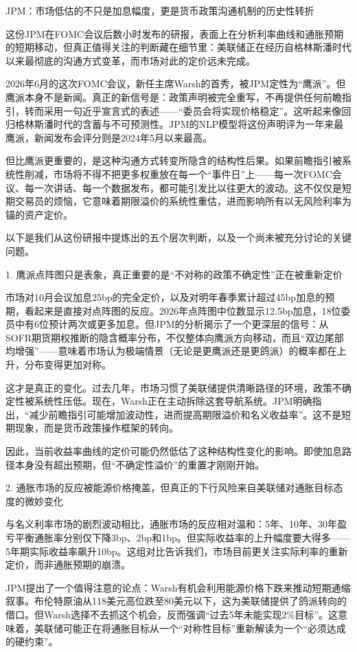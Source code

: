 \documentclass[11pt]{ctexart}
\begin{document}
JPM：市场低估的不只是加息幅度，更是货币政策沟通机制的历史性转折

这份JPM在FOMC会议后数小时发布的研报，表面上在分析利率曲线和通胀预期的短期移动，但真正值得关注的判断藏在细节里：美联储正在经历自格林斯潘时代以来最彻底的沟通方式变革，而市场对此的定价远未完成。

2026年6月的这次FOMC会议，新任主席Warsh的首秀，被JPM定性为“鹰派”。但鹰派本身不是新闻。真正的新信号是：政策声明被完全重写，不再提供任何前瞻指引，转而采用一句近乎宣言式的表述——“委员会将实现价格稳定”。这听起来像回归格林斯潘时代的含蓄与不可预测性。JPM的NLP模型将这份声明评为一年来最鹰派，新闻发布会评分则是2024年5月以来最高。

但比鹰派更重要的，是这种沟通方式转变所隐含的结构性后果。如果前瞻指引被系统性削减，市场将不得不把更多权重放在每一个“事件日”上——每一次FOMC会议、每一次讲话、每一个数据发布，都可能引发比以往更大的波动。这不仅仅是短期交易员的烦恼，它意味着期限溢价的系统性重估，进而影响所有以无风险利率为锚的资产定价。

以下是我们从这份研报中提炼出的五个层次判断，以及一个尚未被充分讨论的关键问题。

1. 鹰派点阵图只是表象，真正重要的是“不对称的政策不确定性”正在被重新定价

市场对10月会议加息25bp的完全定价，以及对明年春季累计超过45bp加息的预期，看起来是直接对点阵图的反应。2026年点阵图中位数显示12.5bp加息，18位委员中有6位预计两次或更多加息。但JPM的分析揭示了一个更深层的信号：从SOFR期货期权推断的隐含概率分布，不仅整体向鹰派方向移动，而且“双边尾部均增强”——意味着市场认为极端情景（无论是更鹰派还是更鸽派）的概率都在上升，分布变得更加对称。

这才是真正的变化。过去几年，市场习惯了美联储提供清晰路径的环境，政策不确定性被系统性压低。现在，Warsh正在主动拆除这套导航系统。JPM明确指出，“减少前瞻指引可能增加波动性，进而提高期限溢价和名义收益率”。这不是短期现象，而是货币政策操作框架的转向。

因此，当前收益率曲线的定价可能仍然低估了这种结构性变化的影响。即使加息路径本身没有超出预期，但“不确定性溢价”的重置才刚刚开始。

2. 通胀市场的反应被能源价格掩盖，但真正的下行风险来自美联储对通胀目标态度的微妙变化

与名义利率市场的剧烈波动相比，通胀市场的反应相对温和：5年、10年、30年盈亏平衡通胀率分别仅下降3bp、2bp和1bp。但实际收益率的上升幅度要大得多——5年期实际收益率飙升10bp。这组对比告诉我们，市场目前更关注实际利率的重新定价，而非通胀预期的崩溃。

JPM提出了一个值得注意的论点：Warsh有机会利用能源价格下跌来推动短期通缩叙事。布伦特原油从118美元高位跌至80美元以下，这为美联储提供了鸽派转向的借口。但Warsh选择不去抓这个机会，反而强调“过去5年未能实现2\%目标”。这意味着，美联储可能正在将通胀目标从一个“对称性目标”重新解读为一个“必须达成的硬约束”。
\end{document}
